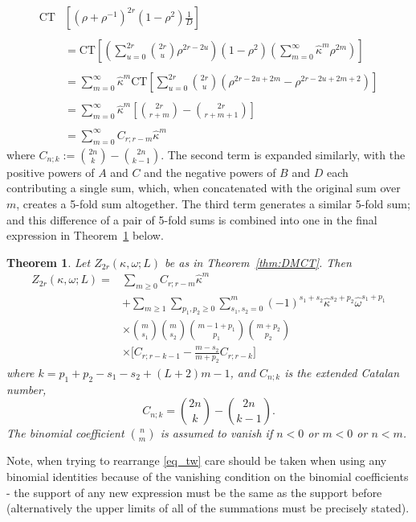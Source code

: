 \documentclass[11pt,a4paper]{article}
\newtheorem{theorem}{Theorem}
\newcommand{\ka}{\kappa}
\newcommand{\w}{\omega}
\newcommand{\p}{\rho}
\begin{document}
\begin{align}
  \text{CT} &\left [ (\p+\p^{-1})^{2r} (1-\p^2)
\frac{1}{D}\right ]\\
\nonumber \\
&=  \text{CT} \left [\left (\sum_{u=0}^{2r}\binom{2r}{u}\p^{2r-2u}\right ) (1-\p^2)
\left (\sum_{m=0}^{\infty} \hat{\ka}^m \p^{2m}\right )\right ]\\
\nonumber \\
&=  \sum_{m=0}^{\infty} \hat{\ka}^m \text{CT} \left [\sum_{u=0}^{2r}\binom{2r}{u}(\p^{2r-2u+2m}-\p^{2r-2u+2m+2})\right ]\\
\nonumber \\
&=  \sum_{m=0}^{\infty} \hat{\ka}^m \left [\binom{2r}{r+m}-\binom{2r}{r+m+1}\right ]
\\
\nonumber \\
&=  \sum_{m=0}^{\infty}C_{r;r-m} \hat{\ka}^m 
\end{align}
where $C_{n;k}:=	\binom{2n}{k}-\binom{2n}{k-1}$.
The second term is expanded similarly,
with the positive powers of $A$ and $C$ and the negative powers of $B$ and $D$ each contributing a single sum, which, when concatenated with the original sum over $m$, creates a 5-fold sum altogether.  The third term generates a similar 5-fold sum; and this difference of a pair of 5-fold sums is combined into one in the final expression in Theorem~\ref{thm:DMCTexpanded} below.  

\begin{theorem} \label{thm:DMCTexpanded} 
	Let $Z_{2r}(\kappa,\omega;L)$ be as in Theorem~\ref{thm:DMCT}.  Then
\begin{equation} 
\begin{split}
Z_{2r}(\kappa,\omega;L) =& \sum_{m \ge 0} C_{r; r-m}\hat{\ka}^m  \\
&
+ \sum_{m \ge 1} \sum_{p_1, p_2 \ge 0} \sum_{s_1, s_2 =0}^m (-1)^{s_1+s_2} \hat{\ka}^{s_2+p_2} \hat{\w}^{s_1 + p_1}\\
& \times
\binom{m}{s_1}\binom{m}{s_2} \binom{m-1+p_1}{p_1}\binom{m+p_2}{p_2}\\
& \times \bigg [
C_{r;r-k-1}   
- \frac{m-s_2}{m+p_2}C_{r;r-k}  
\bigg ]
\label{eq_tw}
\end{split}
\end{equation}
where $k=p_1+p_2-s_1-s_2+(L+2)m-1$, and $C_{n;k}$ is the extended Catalan number,
\[
	C_{n;k}=	\binom{2n}{k}-\binom{2n}{k-1}.
\]
The binomial coefficient $\binom{n}{m}$ is assumed to vanish if $n< 0$ or  $m <0 $ or $n<m$.
\end{theorem}
Note, when trying to rearrange \eqref{eq_tw} care should be taken when using any binomial identities   because of the vanishing condition on the binomial coefficients - the support of any new expression must be the same as the support before (alternatively the upper limits of  all of the summations must be precisely stated). 
\end{document}

